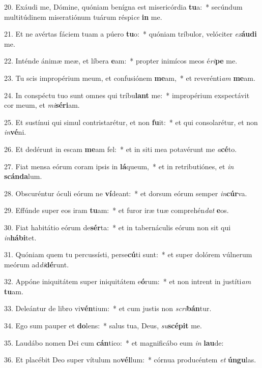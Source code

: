 20. Exáudi me, Dómine, quóniam benígna est misericórdia \textbf{tu}a:~*  secúndum multitúdinem miseratiónum tuárum réspi\textit{ce} \textbf{in} me.\

21. Et ne avértas fáciem tuam a púero \textbf{tu}o:~*  quóniam tríbulor, velóciter \textit{ex}\textbf{áu}\textbf{di} me.\

22. Inténde ánimæ meæ, et líbera \textbf{e}am:~*  propter inimícos meos é\textit{ri}\textbf{pe} me.\

23. Tu scis impropérium meum, et confusiónem \textbf{me}am,~*  et reverénti\textit{am} \textbf{me}am.\

24. In conspéctu tuo sunt omnes qui tríbu\textbf{lant} me:~*  impropérium exspectávit cor meum, et \textit{mi}\textbf{sé}\textbf{ri}am.\

25. Et sustínui qui simul contristarétur, et non \textbf{fu}it:~*  et qui consolarétur, et non \textit{in}\textbf{vé}ni.\

26. Et dedérunt in escam \textbf{me}am fel:~*  et in siti mea potavérunt me \textit{a}\textbf{cé}to.\

27. Fiat mensa eórum coram ipsis in \textbf{lá}queum,~*  et in retributiónes, et \textit{in} \textbf{scán}\textbf{da}lum.\

28. Obscuréntur óculi eórum ne \textbf{ví}deant:~*  et dorsum eórum semper \textit{in}\textbf{cúr}va.\

29. Effúnde super eos iram \textbf{tu}am:~*  et furor iræ tuæ comprehén\textit{dat} \textbf{e}os.\

30. Fiat habitátio eórum de\textbf{sér}ta:~*  et in tabernáculis eórum non sit qui \textit{in}\textbf{há}\textbf{bi}tet.\

31. Quóniam quem tu percussísti, perse\textbf{cú}ti sunt:~*  et super dolórem vúlnerum meórum ad\textit{di}\textbf{dé}runt.\

32. Appóne iniquitátem super iniquitátem e\textbf{ó}rum:~*  et non intrent in justíti\textit{am} \textbf{tu}am.\

33. Deleántur de libro vi\textbf{vén}tium:~*  et cum justis non \textit{scri}\textbf{bán}tur.\

34. Ego sum pauper et \textbf{do}lens:~*  salus tua, Deus, \textit{su}\textbf{scé}\textbf{pit} me.\

35. Laudábo nomen Dei cum \textbf{cán}tico:~*  et magnificábo eum \textit{in} \textbf{lau}de:\

36. Et placébit Deo super vítulum no\textbf{vél}lum:~*  córnua producéntem \textit{et} \textbf{ún}\textbf{gu}las.\


